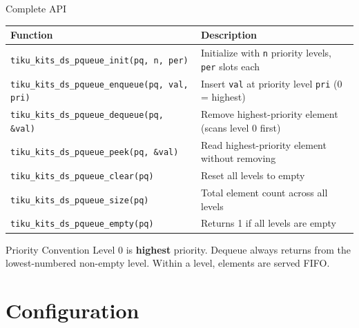 \documentclass[aspectratio=169, 10pt]{beamer}
\begin{document}
\begin{frame}[fragile]{Complete API}
\begin{table}
\centering
\small
\begin{tabular}{@{}lp{8cm}@{}}
\toprule
\textbf{Function} & \textbf{Description} \\
\midrule
\texttt{tiku\_kits\_ds\_pqueue\_init(pq, n, per)}
  & Initialize with \texttt{n} priority levels, \texttt{per} slots each \\
\midrule
\texttt{tiku\_kits\_ds\_pqueue\_enqueue(pq, val, pri)}
  & Insert \texttt{val} at priority level \texttt{pri} (0 = highest) \\
\texttt{tiku\_kits\_ds\_pqueue\_dequeue(pq, \&val)}
  & Remove highest-priority element (scans level 0 first) \\
\texttt{tiku\_kits\_ds\_pqueue\_peek(pq, \&val)}
  & Read highest-priority element without removing \\
\midrule
\texttt{tiku\_kits\_ds\_pqueue\_clear(pq)}
  & Reset all levels to empty \\
\texttt{tiku\_kits\_ds\_pqueue\_size(pq)}
  & Total element count across all levels \\
\texttt{tiku\_kits\_ds\_pqueue\_empty(pq)}
  & Returns 1 if all levels are empty \\
\bottomrule
\end{tabular}
\end{table}

\vspace{0.3em}
\begin{alertblock}{Priority Convention}
Level 0 is \textbf{highest} priority. Dequeue always returns from the
lowest-numbered non-empty level. Within a level, elements are served FIFO.
\end{alertblock}
\end{frame}

\section{Configuration}
\end{document}
